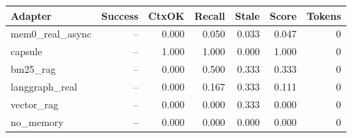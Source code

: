 \begin{tabular}{lrrrrrr}
\hline
Adapter & Success & CtxOK & Recall & Stale & Score & Tokens \\
\hline
mem0\_real\_async & -- & 0.000 & 0.050 & 0.033 & 0.047 & 0 \\
capsule & -- & 1.000 & 1.000 & 0.000 & 1.000 & 0 \\
bm25\_rag & -- & 0.000 & 0.500 & 0.333 & 0.333 & 0 \\
langgraph\_real & -- & 0.000 & 0.167 & 0.333 & 0.111 & 0 \\
vector\_rag & -- & 0.000 & 0.000 & 0.333 & 0.000 & 0 \\
no\_memory & -- & 0.000 & 0.000 & 0.000 & 0.000 & 0 \\
\hline
\end{tabular}
